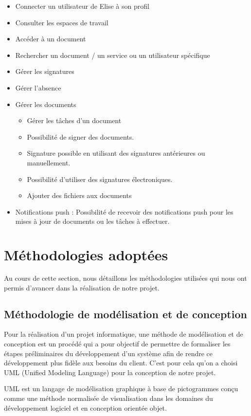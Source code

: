 \begin{itemize}
  \item Connecter un utilisateur de Elise à son profil
  \item Consulter les espaces de travail
  \item Accéder à un document
  \item Rechercher un document / un service ou un utilisateur spécifique
  \item Gérer les signatures
  \item Gérer l'absence
  \item Gérer les documents
  \begin{itemize}
    \item Gérer les tâches d'un document
    \item Possibilité de signer des documents.
    \item Signature possible en utilisant des signatures antérieures ou manuellement.
    \item Possibilité d'utiliser des signatures électroniques.
    \item	Ajouter des fichiers aux documents
  \end{itemize}
  \item Notifications push : Possibilité de recevoir des notifications push pour les mises à jour de documents ou les tâches à effectuer.
\end{itemize}

\section{Méthodologies adoptées}
Au cours de cette section, nous détaillons les méthodologies utilisées qui nous ont permis d'avancer dans la réalisation de notre projet.

\subsection{Méthodologie de modélisation et de conception}
Pour la réalisation d'un projet informatique, une méthode de modélisation et de conception est un procédé qui a pour objectif de permettre de formaliser les étapes préliminaires du développement d'un système afin de rendre ce développement plus fidèle aux besoins du client. C'est pour cela qu'on a choisi UML (Unified Modeling Language) pour la conception de notre projet.\\

\medskip

UML\cite{umlCite} est un langage de modélisation graphique à base de pictogrammes conçu comme une méthode normalisée de visualisation dans les domaines du développement logiciel et en conception orientée objet.



